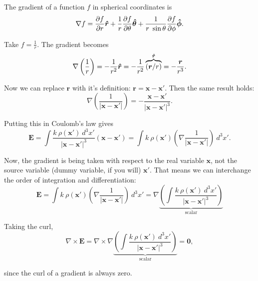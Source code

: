 \documentclass{article}
\begin{document}
The gradient of a function $f$ in spherical coordinates is
\begin{equation*}
    \nabla f = \frac{\partial f}{\partial r} \bm{\hat{r}} + \frac{1}{r} \frac{\partial f}{\partial \theta} \bm{\hat{\theta}} + \frac{1}{r\ \sin{\theta}} \frac{\partial f}{\partial \phi} \bm{\hat{\phi}}.
\end{equation*}

Take $\displaystyle f = \frac{1}{r}$. The gradient becomes
\begin{equation*}
    \nabla \left( \frac{1}{r} \right) = -\frac{1}{r^2} \bm{\hat{r}} = -\frac{1}{r^2} \overbrace{\left( \bm{r} / r \right)}^{\bm{\hat{r}}} = -\frac{\bm{r}}{r^3}.
\end{equation*}

Now we can replace $\bm{r}$ with it's definition: $\bm{r} = \bm{x} - \bm{x'}$. Then the same result holds:
\begin{equation*}
    \nabla \left( \frac{1}{\left| \bm{x} - \bm{x'} \right|} \right) = -\frac{\bm{x} - \bm{x'}}{\left| \bm{x} - \bm{x'} \right|^3}.
\end{equation*}

Putting this in Coulomb's law gives
\begin{equation*}
    \bm{E} = \int \frac{k\ \rho(\bm{x'})\ d^3x'}{\left| \bm{x} - \bm{x'} \right|^3} \left( \bm{x} - \bm{x'} \right) = \int k\ \rho(\bm{x'}) \left( \nabla \frac{1}{\left| \bm{x} - \bm{x'} \right|} \right)\ d^3x'.
\end{equation*}

Now, the gradient is being taken with respect to the real variable $\bm{x}$, not the source variable (dummy variable, if you will) $\bm{x'}$. That means we can interchange the order of integration and differentiation:
\begin{equation*}
    \bm{E} = \int k\ \rho(\bm{x'}) \left( \nabla \frac{1}{\left| \bm{x} - \bm{x'} \right|} \right)\ d^3x' = \nabla \underbrace{\left( \int \frac{k\ \rho(\bm{x'})\ d^3x'}{\left| \bm{x} - \bm{x'} \right|^3} \right)}_{\text{scalar}}
\end{equation*}

Taking the curl,
\begin{equation*}
    \nabla \times \bm{E} = \nabla \times \nabla \underbrace{\left( \int \frac{k\ \rho(\bm{x'})\ d^3x'}{\left| \bm{x} - \bm{x'} \right|^3} \right)}_{\text{scalar}} = \bm{0},
\end{equation*}

since the curl of a gradient is always zero.
\end{document}
